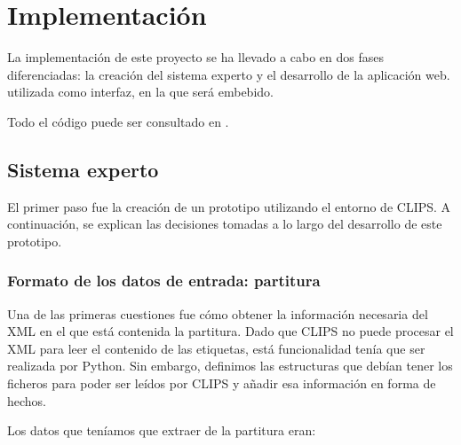 \chapter{Implementación}

La implementación de este proyecto se ha llevado a cabo en dos fases diferenciadas: la creación del sistema experto y el desarrollo de la aplicación web. utilizada como interfaz, en la que será embebido. 

Todo el código puede ser consultado en \cite{CODIGO}.

\section{Sistema experto}

El primer paso fue la creación de un prototipo utilizando el entorno de CLIPS. A continuación, se explican las decisiones tomadas a lo largo del desarrollo de este prototipo.

\subsection{Formato de los datos de entrada: partitura}

Una de las primeras cuestiones fue cómo obtener la información necesaria del XML en el que está contenida la partitura. Dado que CLIPS no puede procesar el XML para leer el contenido de las etiquetas, está funcionalidad tenía que ser realizada por Python. Sin embargo, definimos las estructuras que debían tener los ficheros para poder ser leídos por CLIPS y añadir esa información en forma de hechos.

Los datos que teníamos que extraer de la partitura eran:

